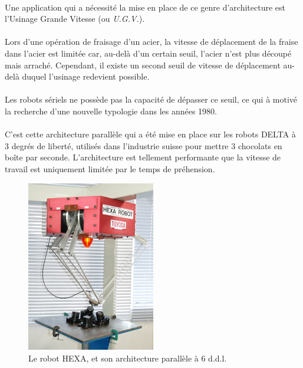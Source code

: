 \documentclass[a4paper,10pt]{article}
\begin{document}
            \paragraph{}
                Une application qui a nécessité la mise en place de ce genre d'architecture 
                est l'Usinage Grande Vitesse (ou \textit{U.G.V.}).
                
            \paragraph{}
                Lors d'une opération de fraisage d'un acier, la vitesse de déplacement
                de la fraise dans l'acier est limitée car, au-delà d'un certain seuil, 
                l'acier n'est plus découpé mais arraché. Cependant, il existe un second 
                seuil de vitesse de déplacement au-delà duquel l'usinage redevient possible. 
                
            \paragraph{}
                Les robots sériels ne possède pas la capacité de dépasser ce seuil, ce qui 
                à motivé la recherche d'une nouvelle typologie dans les années 1980. 
                
            \paragraph{}
                C'est cette architecture parallèle qui a été mise en place sur les robots 
                DELTA à 3 degrés de liberté, utilisés dans l'industrie suisse pour mettre 
                3 chocolats en boîte par seconde. L'architecture est tellement performante 
                que la vitesse de travail est uniquement limitée par le temps de préhension. 
                
            \begin{figure}
                \centering
                \includegraphics[width=0.5\textwidth]{M-1994-3_011.jpg}
                \caption{Le robot HEXA, et son architecture parallèle à 6 d.d.l.}
                \label{fig:hexa}
            \end{figure}
                
\end{document}
